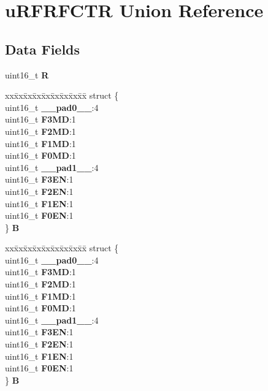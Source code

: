 \hypertarget{unionuRFRFCTR}{}\section{u\+R\+F\+R\+F\+C\+TR Union Reference}
\label{unionuRFRFCTR}
\subsection*{Data Fields}
\begin{DoxyCompactItemize}
\item 
\mbox{\label{unionuRFRFCTR_aa88c2d3f9fc9f7fad1d8c49ea46b4948}} 
uint16\+\_\+t {\bfseries R}
\item 
\mbox{\label{unionuRFRFCTR_a8385369a53fb6503e986d27a25e6a160}} 
\begin{tabbing}
xx\=xx\=xx\=xx\=xx\=xx\=xx\=xx\=xx\=\kill
struct \{\\
\>uint16\_t {\bfseries \_\_pad0\_\_}:4\\
\>uint16\_t {\bfseries F3MD}:1\\
\>uint16\_t {\bfseries F2MD}:1\\
\>uint16\_t {\bfseries F1MD}:1\\
\>uint16\_t {\bfseries F0MD}:1\\
\>uint16\_t {\bfseries \_\_pad1\_\_}:4\\
\>uint16\_t {\bfseries F3EN}:1\\
\>uint16\_t {\bfseries F2EN}:1\\
\>uint16\_t {\bfseries F1EN}:1\\
\>uint16\_t {\bfseries F0EN}:1\\
\} {\bfseries B}\\

\end{tabbing}\item 
\mbox{\label{unionuRFRFCTR_a637841c5182cd7739693592da517de7b}} 
\begin{tabbing}
xx\=xx\=xx\=xx\=xx\=xx\=xx\=xx\=xx\=\kill
struct \{\\
\>uint16\_t {\bfseries \_\_pad0\_\_}:4\\
\>uint16\_t {\bfseries F3MD}:1\\
\>uint16\_t {\bfseries F2MD}:1\\
\>uint16\_t {\bfseries F1MD}:1\\
\>uint16\_t {\bfseries F0MD}:1\\
\>uint16\_t {\bfseries \_\_pad1\_\_}:4\\
\>uint16\_t {\bfseries F3EN}:1\\
\>uint16\_t {\bfseries F2EN}:1\\
\>uint16\_t {\bfseries F1EN}:1\\
\>uint16\_t {\bfseries F0EN}:1\\
\} {\bfseries B}\\


\end{tabbing}
\end{DoxyCompactItemize}
